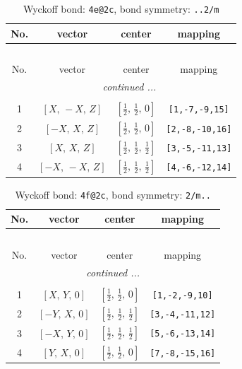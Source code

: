 \documentclass[fleqn,8pt]{jsarticle}
\begin{document}
\renewcommand{\arraystretch}{1.2}
\begin{longtable}{cccc}
\caption{Wyckoff bond: {\tt 4e@2c}, bond symmetry: {\tt ..2/m}}
 \\
 \hline \hline
No. & vector & center & mapping \\ \hline \endfirsthead

\multicolumn{3}{l}{\tablename\ \thetable{}} \\
 \hline \hline
No. & vector & center & mapping \\ \hline \endhead

 \hline \hline
\multicolumn{3}{r}{\footnotesize\it continued ...} \\ \endfoot

 \hline \hline
\multicolumn{3}{r}{} \\ \endlastfoot

1 & $\left[ X,\, - X,\, Z \right]$ & $\left[ \frac{1}{2},\, \frac{1}{2},\, 0 \right]$ & {\tt [1,-7,-9,15]} \\ \hline
2 & $\left[ - X,\, X,\, Z \right]$ & $\left[ \frac{1}{2},\, \frac{1}{2},\, 0 \right]$ & {\tt [2,-8,-10,16]} \\ \hline
3 & $\left[ X,\, X,\, Z \right]$ & $\left[ \frac{1}{2},\, \frac{1}{2},\, \frac{1}{2} \right]$ & {\tt [3,-5,-11,13]} \\ \hline
4 & $\left[ - X,\, - X,\, Z \right]$ & $\left[ \frac{1}{2},\, \frac{1}{2},\, \frac{1}{2} \right]$ & {\tt [4,-6,-12,14]} \\
\end{longtable}
\renewcommand{\arraystretch}{1.2}
\begin{longtable}{cccc}
\caption{Wyckoff bond: {\tt 4f@2c}, bond symmetry: {\tt 2/m..}}
 \\
 \hline \hline
No. & vector & center & mapping \\ \hline \endfirsthead

\multicolumn{3}{l}{\tablename\ \thetable{}} \\
 \hline \hline
No. & vector & center & mapping \\ \hline \endhead

 \hline \hline
\multicolumn{3}{r}{\footnotesize\it continued ...} \\ \endfoot

 \hline \hline
\multicolumn{3}{r}{} \\ \endlastfoot

1 & $\left[ X,\, Y,\, 0 \right]$ & $\left[ \frac{1}{2},\, \frac{1}{2},\, 0 \right]$ & {\tt [1,-2,-9,10]} \\ \hline
2 & $\left[ - Y,\, X,\, 0 \right]$ & $\left[ \frac{1}{2},\, \frac{1}{2},\, \frac{1}{2} \right]$ & {\tt [3,-4,-11,12]} \\ \hline
3 & $\left[ - X,\, Y,\, 0 \right]$ & $\left[ \frac{1}{2},\, \frac{1}{2},\, \frac{1}{2} \right]$ & {\tt [5,-6,-13,14]} \\ \hline
4 & $\left[ Y,\, X,\, 0 \right]$ & $\left[ \frac{1}{2},\, \frac{1}{2},\, 0 \right]$ & {\tt [7,-8,-15,16]} \\
\end{longtable}
\end{document}

